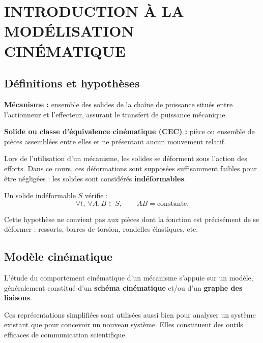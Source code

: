\section{INTRODUCTION À LA MODÉLISATION CINÉMATIQUE}

\subsection{Définitions et hypothèses}

\begin{TLDefinition}
\textbf{Mécanisme :} ensemble des solides de la chaîne de puissance situés
entre l'actionneur et l'effecteur, assurant le transfert de puissance mécanique.
\end{TLDefinition}

\begin{TLDefinition}
\textbf{Solide ou classe d'équivalence cinématique (CEC) :} pièce ou ensemble
de pièces assemblées entre elles et ne présentant aucun mouvement relatif.
\end{TLDefinition}

Lors de l'utilisation d'un mécanisme, les solides se déforment sous l'action
des efforts. Dans ce cours, ces déformations sont supposées suffisamment
faibles pour être négligées : les solides sont considérés
\textbf{indéformables}.

\begin{TLDefinition}
Un solide indéformable \(S\) vérifie :
\[
\forall t,\ \forall A,B\in S,\qquad AB=\text{constante}.
\]
\end{TLDefinition}

\begin{TLRemark}
Cette hypothèse ne convient pas aux pièces dont la fonction est précisément
de se déformer : ressorts, barres de torsion, rondelles élastiques, etc.
\end{TLRemark}

\subsection{Modèle cinématique}

L'étude du comportement cinématique d'un mécanisme s'appuie sur un modèle,
généralement constitué d'un \textbf{schéma cinématique} et/ou d'un
\textbf{graphe des liaisons}.


Ces représentations simplifiées sont utilisées aussi bien pour analyser un
système existant que pour concevoir un nouveau système. Elles constituent
des outils efficaces de communication scientifique.

